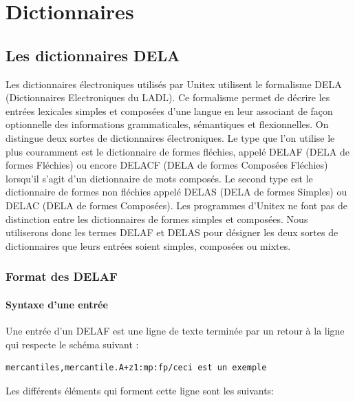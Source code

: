 \chapter{Dictionnaires}
\label{chap-dictionaries}

\section{Les dictionnaires DELA}

Les dictionnaires électroniques utilisés par Unitex utilisent le formalisme DELA (Dictionnaires
Electroniques du LADL). Ce formalisme permet de décrire les entrées lexicales simples et composées
 d’une langue en leur associant de façon optionnelle des
informations grammaticales, sémantiques et flexionnelles. On distingue deux sortes de dictionnaires
électroniques. Le type que l’on utilise le plus couramment est le dictionnaire de formes fléchies,
appelé DELAF (DELA de formes Fléchies) ou encore DELACF (DELA de formes Composées
Fléchies) lorsqu’il s’agit d’un dictionnaire de mots composés.
Le second type est le dictionnaire de formes non fléchies appelé DELAS (DELA de formes Simples)
ou DELAC (DELA de formes Composées).
Les programmes d’Unitex ne font pas de distinction entre les dictionnaires de formes
simples et composées. Nous utiliserons donc les termes DELAF et DELAS pour désigner les deux sortes
de dictionnaires que leurs entrées soient simples, composées ou mixtes.

\subsection{Format des DELAF}
\label{section-DELAF-format}
\subsubsection{Syntaxe d’une entrée}
Une entrée d’un DELAF est une ligne de texte terminée par un retour à la ligne qui
respecte le schéma suivant :

\bigskip
\begin{verbatim}
mercantiles,mercantile.A+z1:mp:fp/ceci est un exemple
\end{verbatim}

\bigskip
\noindent Les différents éléments qui forment cette ligne sont les suivants:

